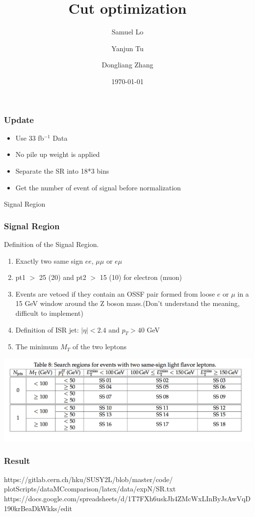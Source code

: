 \documentclass[mathserif,serif]{beamer}
\title{Cut optimization}
\author
{
Samuel Lo \inst{1}
\and
Yanjun Tu  \inst{1}
\and
Dongliang Zhang  \inst{2}
}
\institute
{
\inst{1}
The University of Hong Kong
\and
\inst{2}
University of Michigan
}
\date{\today}
\begin{document}
\frame{\titlepage}

\begin{frame}
\frametitle{Update}
\begin{itemize}
\normalsize
\item Use 33 fb$^{-1}$ Data
\item No pile up weight is applied
\item Separate the SR into 18*3 bins

\item Get the number of event of signal before normalization
\end{itemize}
\end{frame}

\begin{frame}
\begin{center}
\huge
Signal Region
\end{center}
\end{frame}

\begin{frame}
\frametitle{Signal Region}
Definition of the Signal Region.
\begin{enumerate}
\item Exactly two same sign $ee$, $\mu\mu$ or $e\mu$
\item pt1 $>$ 25 (20) and pt2 $>$ 15 (10) for electron (muon)
\item Events are vetoed if they contain an OSSF pair formed from loose $e$ or $\mu$ in a 15 GeV window around the Z boson mass.(Don't understand the meaning, difficult to implement)
\item Definition of ISR jet: $|\eta| < 2.4$ and $p_T > 40$ GeV
\item The minimum $M_T$ of the two leptons
\end{enumerate}
\includegraphics[width=1\textwidth]{data/SR.png}
\end{frame}

\begin{frame}
\frametitle{Result}
\tiny
https://gitlab.cern.ch/hku/SUSY2L/blob/master/code/ \\
plotScripts/dataMCcomparison/latex/data/expN/SR.txt \\
https://docs.google.com/spreadsheets/d/1T7FXh6uskJh4ZMcWxLInByJsAwVqD190krBeaDkWkks/edit
\end{frame}
\end{document}
